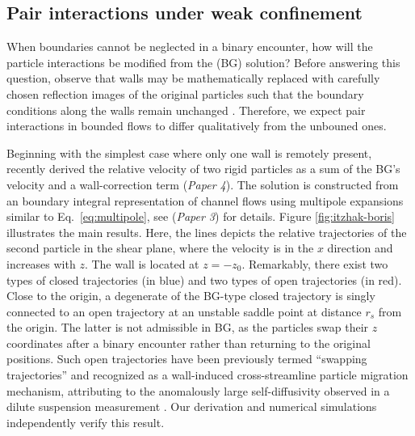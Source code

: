 \subsection{Pair interactions under weak confinement}

When boundaries cannot be neglected in a binary encounter, how will the particle interactions be modified from the \cite{batchelor_green_1972} (BG) solution?
Before answering this question, observe that walls may be mathematically replaced with carefully chosen reflection images of the original particles such that the boundary conditions along the walls remain unchanged \citep{blake_1971, LironMochon}.
Therefore, we expect pair interactions in bounded flows to differ qualitatively from the unbouned ones.

Beginning with the simplest case where only one wall is remotely present, \cite{Fouxon_Rubinstein2019} recently derived the relative velocity of two rigid particles as a sum of the BG's velocity and a wall-correction term (\emph{Paper 4}). The solution is constructed from an boundary integral representation of channel flows using multipole expansions similar to Eq.\ \eqref{eq:multipole}, see \cite{Fouxon_2017} (\emph{Paper 3}) for details.
Figure \ref{fig:itzhak-boris} illustrates the main results.
Here, the lines depicts the relative trajectories of the second particle in the shear plane, where the velocity is in the $x$ direction and increases with $z$. The wall is located at $z=-z_0$.
Remarkably, there exist two types of closed trajectories (in blue) and two types of open trajectories (in red).
Close to the origin, a degenerate of the BG-type closed trajectory is singly connected to an open trajectory at an unstable saddle point at distance $r_s$ from the origin.
The latter is not admissible in BG, as the particles swap their $z$ coordinates after a binary encounter rather than returning to the original positions.
Such open trajectories have been previously termed ``swapping trajectories'' and recognized as a wall-induced cross-streamline particle migration mechanism, attributing to the anomalously large self-diffusivity observed in a dilute suspension measurement \citep{Zarraga_Leighton2002, zurita-gotor_2007}.
Our derivation and numerical simulations independently verify this result.

